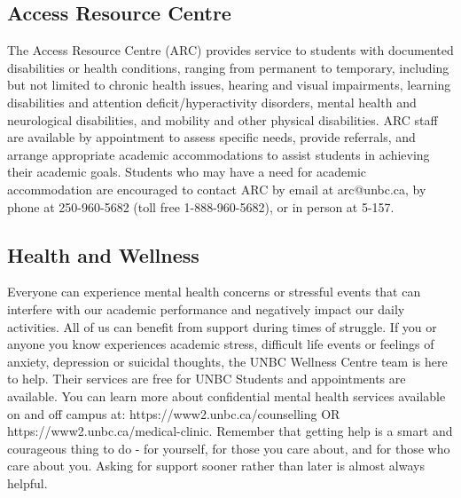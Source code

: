 \documentclass[letterpaper,12pt]{article}
\theoremstyle{dotlessS}
\begin{document}
\subsection*{Access Resource Centre}
The Access Resource Centre (ARC) provides service to students with documented disabilities or health conditions, ranging from permanent to temporary, including but not limited to chronic health issues, hearing and visual impairments, learning disabilities and attention deficit/hyperactivity disorders, mental health and neurological disabilities, and mobility and other physical disabilities. ARC staff are available by appointment to assess specific needs, provide referrals, and arrange appropriate academic accommodations to assist students in achieving their academic goals. Students who may have a need for academic accommodation are encouraged to contact ARC by email at arc@unbc.ca, by phone at 250-960-5682 (toll free 1-888-960-5682), or in person at 5-157. 


\subsection*{Health and Wellness}
Everyone can experience mental health concerns or stressful events that can interfere with our academic performance and negatively impact our daily activities.
All of us can benefit from support during times of struggle.  If you or anyone you know experiences academic stress, difficult life events or feelings of anxiety, depression or suicidal thoughts, the UNBC Wellness Centre team is here to help. Their services are free for UNBC Students and appointments are available. You can learn more about confidential mental health services available on and off campus at: https://www2.unbc.ca/counselling  OR https://www2.unbc.ca/medical-clinic. Remember that getting help is a smart and courageous thing to do - for yourself, for those you care about, and for those who care about you. Asking for support sooner rather than later is almost always helpful. 
\end{document}

